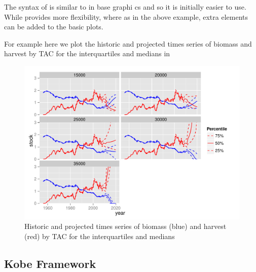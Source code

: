 \documentclass[shortnames,nojss,article]{jss}
\begin{document}
\clearpage

The syntax of  is similar to  in base graphi	cs and so it is initially easier to use. 
While  provides more flexibility, where as in the above example, extra elements can be added to the basic plots.

For example here we plot the historic and projected times series of biomass and harvest by TAC for the interquartiles and medians in

\begin{figure}\begin{center}
\begin{Schunk}
\end{Schunk}
\includegraphics{kobe-014}
\caption{Historic and projected times series of biomass (blue) and harvest (red) by TAC for the interquartiles and medians}
\end{center}\end{figure}

\clearpage

\subsection{Kobe Framework}
\end{document}
